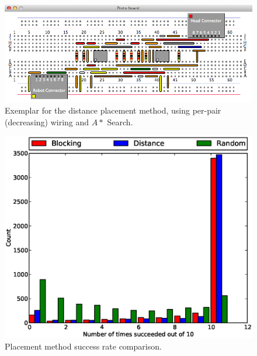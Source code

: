 \begin{figure}[H]
\begin{center}
\includegraphics[width=\textwidth]{Images/exemplar_distance.png}
\caption[Distance method exemplar]{Exemplar for the distance placement method,
using per-pair (decreasing) wiring and $A*$ Search.}
\end{center}
\end{figure}

\begin{figure}[H]
\begin{center}
\includegraphics[width=\textwidth]{Images/placement_success_comparison.eps}
\caption[Placement method success rate comparison]{Placement method success rate
comparison.}
\label{fig:placement_success}
\end{center}
\end{figure}

